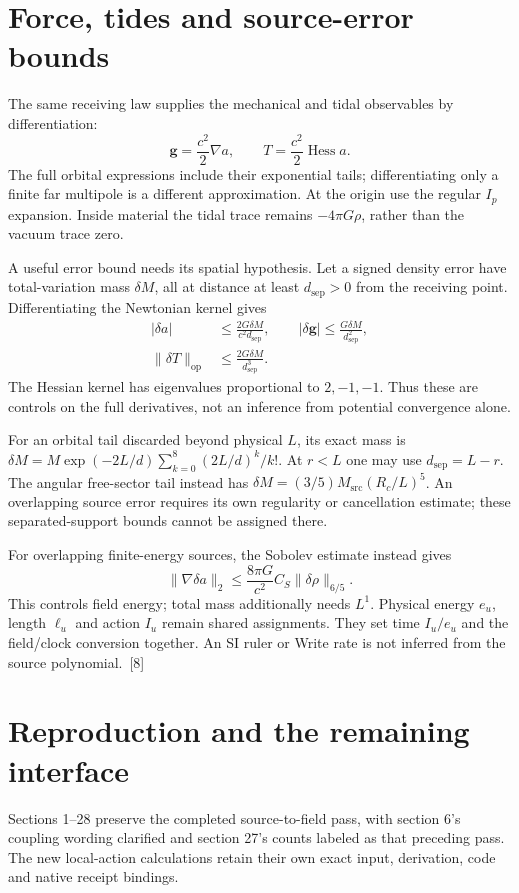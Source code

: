\documentclass[10pt,twocolumn,letterpaper]{article}
\begin{document}
\section{Force, tides and source-error bounds}
The same receiving law supplies the mechanical and tidal observables by differentiation:
\[
\mathbf g=\frac{c^2}2\nabla a,\qquad T=\frac{c^2}2\operatorname{Hess}a.
\]
The full orbital expressions include their exponential tails; differentiating only a finite far multipole is a different approximation. At the origin use the regular $I_p$ expansion. Inside material the tidal trace remains $-4\pi G\rho$, rather than the vacuum trace zero.

A useful error bound needs its spatial hypothesis. Let a signed density error have total-variation mass $\delta M$, all at distance at least $d_{\mathrm{sep}}>0$ from the receiving point. Differentiating the Newtonian kernel gives
\[
\begin{aligned}
|\delta a|&\leq\frac{2G\delta M}{c^2d_{\mathrm{sep}}},\qquad
|\delta\mathbf g|\leq\frac{G\delta M}{d_{\mathrm{sep}}^2},\\
\lVert\delta T\rVert_{\mathrm{op}}&\leq\frac{2G\delta M}{d_{\mathrm{sep}}^3}.
\end{aligned}
\]
The Hessian kernel has eigenvalues proportional to $2,-1,-1$. Thus these are controls on the full derivatives, not an inference from potential convergence alone.

For an orbital tail discarded beyond physical $L$, its exact mass is $\delta M=M\exp(-2L/d)\sum_{k=0}^8(2L/d)^k/k!$. At $r<L$ one may use $d_{\mathrm{sep}}=L-r$. The angular free-sector tail instead has $\delta M=(3/5)M_{\mathrm{src}}(R_c/L)^5$. An overlapping source error requires its own regularity or cancellation estimate; these separated-support bounds cannot be assigned there.

For overlapping finite-energy sources, the Sobolev estimate instead gives
\[
\lVert\nabla\delta a\rVert_2\leq\frac{8\pi G}{c^2}C_S\lVert\delta\rho\rVert_{6/5}.
\]
This controls field energy; total mass additionally needs $L^1$. Physical energy $e_u$, length $\ell_u$ and action $I_u$ remain shared assignments. They set time $I_u/e_u$ and the field/clock conversion together. An SI ruler or Write rate is not inferred from the source polynomial.~[8]

\section{Reproduction and the remaining interface}
Sections 1--28 preserve the completed source-to-field pass, with section 6's coupling wording clarified and section 27's counts labeled as that preceding pass. The new local-action calculations retain their own exact input, derivation, code and native receipt bindings.
\end{document}
